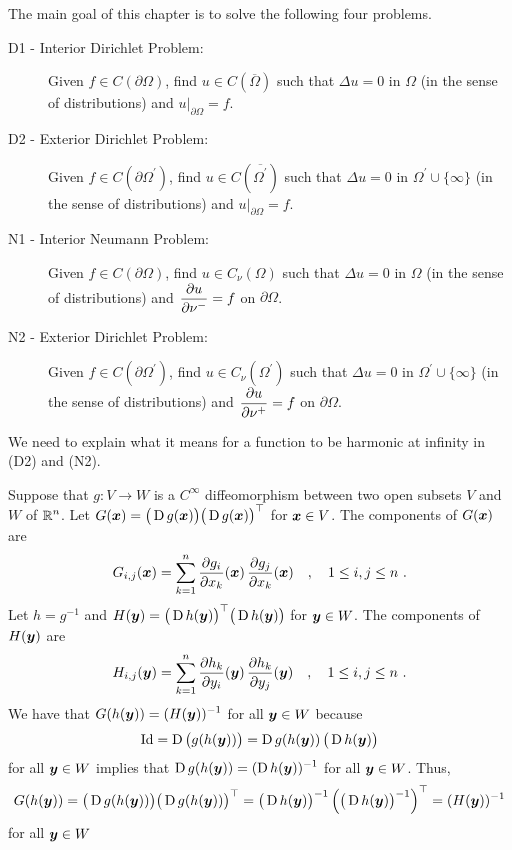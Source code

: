 The main goal of this chapter is to solve the following four problems.
\begin{description}
\item[D1 - Interior Dirichlet Problem:] Given
$f\in C(\partial \Omega)$, find $u \in C(\overline{\Omega})$ 
such that $\Delta u = 0$ in $\Omega$ (in the sense of distributions)
and $\displaystyle u\big|_{\partial \Omega} = f$.
\item[D2 - Exterior Dirichlet Problem:] Given
$\displaystyle f\in C(\partial \Omega^{\prime})$, find
$\displaystyle u \in C(\overline{\Omega^{\prime}})$
such that $\Delta u = 0$ in
$\displaystyle \Omega^{\prime} \cup \{\infty\}$ (in the sense of
distributions) and $\displaystyle u\big|_{\partial \Omega} = f$.
\item[N1 - Interior Neumann Problem:] Given
$f\in C(\partial \Omega)$, find $u \in C_{\nu}(\Omega)$ 
such that $\Delta u = 0$ in $\Omega$ (in the sense of distributions)
and $\displaystyle \frac{\partial{u}}{\partial \nu^-} = f$ on $\partial \Omega$.
\item[N2 - Exterior Dirichlet Problem:] Given
$\displaystyle f\in C(\partial \Omega^{\prime})$, find
$\displaystyle u \in C_{\nu}(\Omega^{\prime})$
such that $\Delta u = 0$ in
$\displaystyle \Omega^{\prime} \cup \{\infty\}$ (in the sense of
distributions) and $\displaystyle \frac{\partial{u}}{\partial \nu^+} = f$ on
$\partial \Omega$.
\end{description}

We need to explain what it means for a function to be harmonic at
infinity in (D2) and (N2).

Suppose that $g: V\rightarrow W$ is a $\displaystyle C^\infty$ diffeomorphism
between two open subsets $V$ and $W$ of $\displaystyle \mathbb{R}^n$.
Let $\displaystyle G({\bm{x}}) = \big(\operatorname{D} g({\bm{x}})\big)
\big(\operatorname{D} g({\bm{x}})\big)^\top$ for
${\bm{x}} \in V$.  The components of $G({\bm{x}})$ are
\[
G_{i,j}({\bm{x}}) = \sum_{k=1}^n \frac{\partial{g_i}}{\partial x_k}({\bm{x}})\,
\frac{\partial{g_j}}{\partial x_k}({\bm{x}}) \quad , \quad
1 \leq i,j \leq n \ .
\]
Let $h = g^{-1}$ and
$\displaystyle H({\bm{y}}) = \big(\operatorname{D} h({\bm{y}})\big)^\top
\big(\operatorname{D} h({\bm{y}})\big)$ for ${\bm{y}} \in W$.  The components of
$H({\bm{y}})$ are
\[
H_{i,j}({\bm{y}}) = \sum_{k=1}^n \frac{\partial{h_k}}{\partial y_i}({\bm{y}})\,
\frac{\partial{h_k}}{\partial y_j}({\bm{y}}) \quad , \quad
1 \leq i,j \leq n \ .
\]
We have that
$\displaystyle G(h({\bm{y}})) = (H({\bm{y}}))^{-1}$ for all ${\bm{y}} \in W$
because
\[
\operatorname{Id} = \operatorname{D} \big( g(h({\bm{y}})) \big) = \operatorname{D} g(h({\bm{y}}))
\,\big(\operatorname{D} h({\bm{y}}) \big)
\]
for all ${\bm{y}} \in W$ implies that
$\displaystyle \operatorname{D} g(h({\bm{y}})) = (\operatorname{D} h({\bm{y}}))^{-1}$
for all ${\bm{y}} \in W$.  Thus,
\[
G(h({\bm{y}})) = \big(\operatorname{D} g(h({\bm{y}}))\big)
\big(\operatorname{D} g(h({\bm{y}}))\big)^\top
= \big(\operatorname{D} h({\bm{y}})\big)^{-1}
\left( \big(\operatorname{D} h({\bm{y}}) \big)^{-1}\right)^\top
= (H({\bm{y}}))^{-1}
\]
for all ${\bm{y}} \in W$

